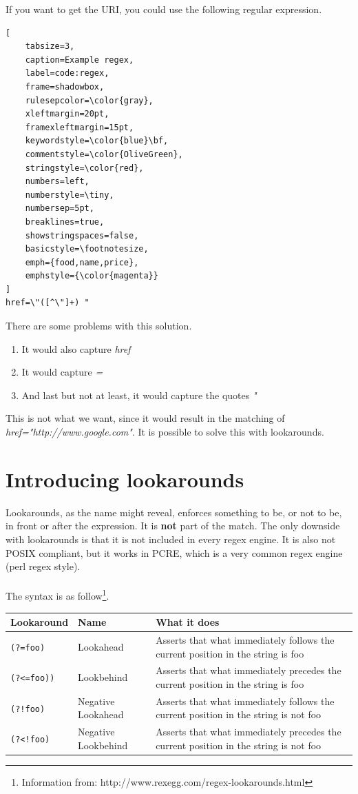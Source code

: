 If you want to get the URI, you could use the following regular expression.
\begin{lstlisting}[
	tabsize=3,
	caption=Example regex,
	label=code:regex,
	frame=shadowbox,
	rulesepcolor=\color{gray},
	xleftmargin=20pt,
	framexleftmargin=15pt,
	keywordstyle=\color{blue}\bf,
	commentstyle=\color{OliveGreen},
	stringstyle=\color{red},
	numbers=left,
	numberstyle=\tiny,
	numbersep=5pt,
	breaklines=true,
	showstringspaces=false,
	basicstyle=\footnotesize,
	emph={food,name,price},
	emphstyle={\color{magenta}}
]
href=\"([^\"]+) "
\end{lstlisting}
There are some problems with this solution.
\begin{enumerate}
\item It would also capture \textit{href}
\item It would capture \textit{=}
\item And last but not at least, it would capture the quotes \textit{"}
\end{enumerate}
This is not what we want, since it would result in the matching of \textit{href="http://www.google.com"}. It is possible to solve this with lookarounds.

\section{Introducing lookarounds}
\label{sec:introducing-lookarounds}
Lookarounds, as the name might reveal, enforces something to be, or not to be, in front or after the expression. It is \textbf{not} part of the match. The only downside with lookarounds is that it is not included in every regex engine. It is also not POSIX compliant, but it works in PCRE, which is a very common regex engine (perl regex style).
\\
\\
The syntax is as follow\footnote{Information from: http://www.rexegg.com/regex-lookarounds.html}.\\
\begin{tabular}{l | l || p{5cm}}
Lookaround & Name & What it does \\ \hline
\texttt{(?=foo)} & Lookahead & Asserts that what immediately follows the current position in the string is foo \\ \hline
\texttt{(?<=foo))} & Lookbehind & Asserts that what immediately precedes the current position in the string is foo \\ \hline
\texttt{(?!foo)} & Negative Lookahead & Asserts that what immediately follows the current position in the string is not foo \\ \hline
\texttt{(?<!foo)} & Negative Lookbehind & Asserts that what immediately precedes the current position in the string is not foo \\ \hline
\end{tabular}

